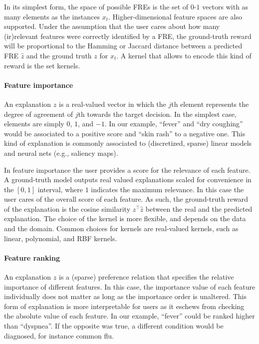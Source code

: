 \documentclass[letterpaper]{article} %
\begin{document}
In its simplest form, the space of possible FREs is the set of $0$-$1$ vectors with as many elements as the instances $x_t$. Higher-dimensional feature spaces are also supported.  Under the assumption that the user cares about how many (ir)relevant features were correctly identified by a FRE, the ground-truth reward will be proportional to the Hamming or Jaccard distance between a predicted FRE $\hat{z}$ and the ground truth $z$ for $x_t$.  A kernel that allows to encode this kind of reward is the set kernels.


\paragraph{Feature importance}  An explanation $z$ is a real-valued vector in which the $j$th element represents the degree of agreement of $j$th towards the target decision.  In the simplest case, elements are simply $0$, $1$, and $-1$.  In our example, ``fever'' and ``dry coughing'' would be associated to a positive score and ``skin rash'' to a negative one.  This kind of explanation is commonly associated to (discretized, sparse) linear models and neural nets (e.g., saliency maps).

In feature importance the user provides a score for the relevance of each feature. A ground-truth model outputs real valued explanations scaled for convenience in the $[0,1]$ interval, where $1$ indicates the maximum relevance. In this case the user cares of the overall score of each feature. As such, the ground-truth reward of the explanation is the cosine similarity $z^\top\hat{z}$ between the real and the predicted explanation.
The choice of the kernel is more flexible, and depends on the data and the domain. Common choices for kernels are real-valued kernels, such as linear, polynomial, and RBF kernels.


\paragraph{Feature ranking} An explanation $z$ is a (sparse) preference relation that specifies the relative importance of different features. In this case, the importance value of each feature individually does not matter as long as the importance order is unaltered. This form of explanation is more interpretable for users as it eschews from checking the absolute value of each feature.  In our example, ``fever'' could be ranked higher than ``dyspnea''.  If the opposite was true, a different condition would be diagnosed, for instance common flu.
\end{document}
